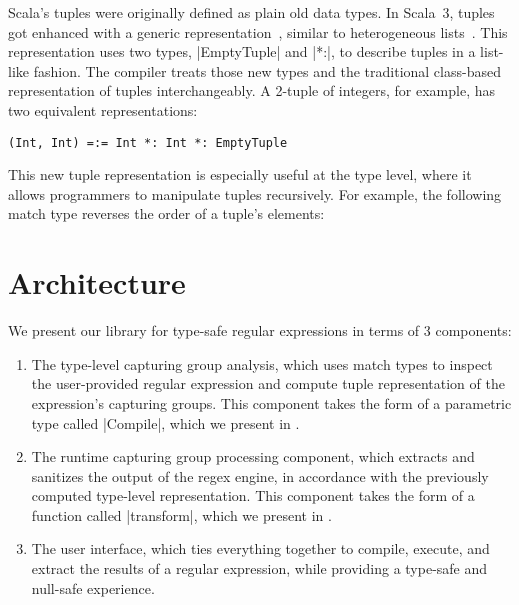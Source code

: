 Scala's tuples were originally defined as plain old data types.
In Scala~3, tuples got enhanced with a generic representation~\citep{bazzucchi2021tuples}, similar to heterogeneous lists~\citep{kiselyov2004strongly}.
This representation uses two types, |EmptyTuple| and |*:|, to describe tuples in a list-like fashion.
The compiler treats those new types and the traditional class-based representation of tuples interchangeably.
A 2-tuple of integers, for example, has two equivalent representations:

\begin{lstlisting}
(Int, Int) =:= Int *: Int *: EmptyTuple
\end{lstlisting}

\noindent
This new tuple representation is especially useful at the type level, where it allows programmers to manipulate tuples recursively.
For example, the following match type reverses the order of a tuple's elements:

\tupleReverseA
\vspace{-3pt}
\tupleReverseB

\section{Architecture}
\label{sec:architecture}

We present our library for type-safe regular expressions in terms of 3 components:

\begin{enumerate}
  \item The type-level capturing group analysis, which uses match types to inspect the user-provided regular expression and compute tuple representation of the expression's capturing groups.
  This component takes the form of a parametric type called |Compile|, which we present in .

  \item The runtime capturing group processing component, which extracts and sanitizes the output of the regex engine, in accordance with the previously computed type-level representation.
  This component takes the form of a function called |transform|, which we present in .

  \item The user interface, which ties everything together to compile, execute, and extract the results of a regular expression, while providing a type-safe and null-safe experience.
\end{enumerate}


